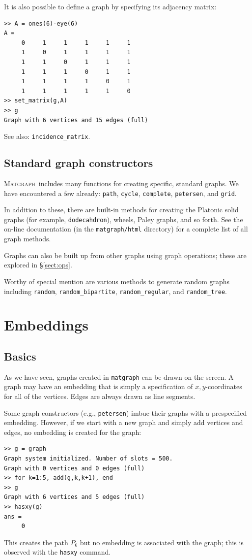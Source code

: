 \documentclass[12pt]{amsart}
\newcommand\matgraph{\textsc{Matgraph}}
\begin{document}
It is also possible to define a graph by specifying its adjacency
matrix:
\begin{verbatim}
>> A = ones(6)-eye(6)
A =
     0     1     1     1     1     1
     1     0     1     1     1     1
     1     1     0     1     1     1
     1     1     1     0     1     1
     1     1     1     1     0     1
     1     1     1     1     1     0
>> set_matrix(g,A)
>> g
Graph with 6 vertices and 15 edges (full)
\end{verbatim}

See also: \verb|incidence_matrix|.


\subsection{Standard graph constructors}

\matgraph\ includes many functions for creating specific, standard
graphs. We have encountered a few already: \verb|path|, \verb|cycle|,
\verb|complete|, \verb|petersen|, and \verb|grid|. 

In addition to these, there are built-in methods for creating the
Platonic solid graphs (for example, \verb|dodecahdron|), wheels, Paley
graphs, and so forth. See the on-line documentation (in the
\verb|matgraph/html| directory) for a complete list of all graph
methods.

Graphs can also be built up from other graphs using graph operations;
these are explored in \S\ref{sect:ops}.

Worthy of special mention are various methods to generate random
graphs including \verb|random|, \verb|random_bipartite|,
\verb|random_regular|, and \verb|random_tree|.


\section{Embeddings}

\subsection{Basics}

As we have seen, graphs created in \verb|matgraph| can be drawn on the
screen. A graph may have an embedding that is simply a specification
of $x,y$-coordinates for all of the vertices. Edges are always drawn
as line segments.

Some graph constructors (e.g., \verb|petersen|) imbue their graphs
with a prespecified embedding. However, if we start with a new graph
and simply add vertices and edges, no embedding is created for the
graph:
\begin{verbatim}
>> g = graph
Graph system initialized. Number of slots = 500.
Graph with 0 vertices and 0 edges (full)
>> for k=1:5, add(g,k,k+1), end
>> g
Graph with 6 vertices and 5 edges (full)
>> hasxy(g)
ans =
     0
\end{verbatim}
This creates the path $P_6$ but no embedding is associated with the
graph; this is observed with the \verb|hasxy| command. 
\end{document}

